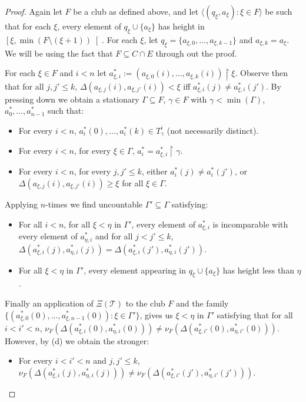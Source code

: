 \documentclass[a4paper,noamsfonts]{amsart}
\theoremstyle{definition}
\newcommand{\seb}{\subseteq}
\newcommand{\setm}{\setminus}
\newcommand{\res}{\!\upharpoonright\!}
\newcommand{\tup}[1]{\langle#1\rangle}
\newcommand{\1}{\mathbbm{1}}
\newcommand{\T}{\mathcal{T}}
\newcommand{\prop}{\Xi}
\begin{document}
\begin{proof}
  Again let $F$ be a club as defined above, and let
  $\tup{(q_{\xi},a_{\xi}) : \xi \in F}$ be such that
  for each $\xi$, every element of $q_{\xi} \cup \{a_{\xi}\}$ has height
  in $\left[\xi,\min(F\setm(\xi+1))\right[$. For each $\xi$,
  let $q_{\xi} = \{a_{\xi,0},\dots,a_{\xi,k-1}\}$ and
  $a_{\xi,k} = a_{\xi}$. We will be using the fact that
  $F \seb C \cap E$ through out the proof.

  For each $\xi \in F$ and $i < n$ let
  $a_{\xi,i}^{*} := (a_{\xi,0}(i),\dots,a_{\xi,k}(i))\res \xi$.
  Observe then that for all $j,j' \le k$,
  $\Delta(a_{\xi,j}(i),a_{\xi,j'}(i)) < \xi$ iff
  $a_{\xi,i}^{*}(j) \neq a_{\xi,i}^{*}(j')$. By pressing down
  we obtain a stationary $\Gamma \seb F$,
  $\gamma \in F$ with $\gamma < \min(\Gamma)$,
  $a^{*}_{0},\dots,a^{*}_{n-1}$ such that:
  \begin{itemize}
    \item[(a)] For every $i < n$, $a^{*}_{i}(0),\dots,a^{*}_{i}(k) \in
    T^{i}_{\gamma}$ (not necessarily distinct).
    \item[(b)] For every $i < n$, for every $\xi \in \Gamma$,
    $a^{*}_{i}  = a_{\xi,i}^{*}\res \gamma$.
    \item[(c)] For every $i < n$, for every $j,j' \le k$,
    either $a^{*}_{i}(j) \neq a^{*}_{i}(j')$, or
    $\Delta(a_{\xi,j}(i),a_{\xi,j'}(i)) \ge \xi$ for all
    $\xi \in \Gamma$.
  \end{itemize}
  Applying
   $n$-times we find uncountable
  $\Gamma' \seb \Gamma$ satisfying:
  \begin{itemize}
    \item[(d)] For all $i < n$, for all $\xi < \eta$ in $\Gamma'$,
    every element of $a^{*}_{\xi,i}$ is incomparable with every element
    of $a^{*}_{\eta,i}$ and for all $j < j' \le k$,
    $\Delta(a^{*}_{\xi,i}(j),a^{*}_{\eta,i}(j)) =
    \Delta(a^{*}_{\xi,i}(j'),a^{*}_{\eta,i}(j'))$.
    \item[(e)] For all $\xi < \eta$ in $\Gamma'$,
    every element appearing in $q_{\xi} \cup \{a_{\xi}\}$ has
    height less than $\eta$.
  \end{itemize}
  Finally an application of $\prop(\T)$ to the club $F$ and the family
  $\{(a^{*}_{\xi,0}(0),\dots,a^{*}_{\xi,n-1}(0)) : \xi \in \Gamma'\}$, gives us
  $\xi < \eta$ in $\Gamma'$ satisfying that for all $i < i' < n$,
  $\nu_{F}(\Delta(a^{*}_{\xi,i}(0),a^{*}_{\eta,i}(0))) \neq
  \nu_{F}(\Delta(a^{*}_{\xi,i'}(0),a^{*}_{\eta,i'}(0)))$. However, by
  (d) we obtain the stronger:
  \begin{itemize}
    \item[(f)] For every $i < i' < n$ and $j,j' \le k$,
    $\nu_{F}(\Delta(a^{*}_{\xi,i}(j),a^{*}_{\eta,i}(j))) \neq
    \nu_{F}(\Delta(a^{*}_{\xi,i'}(j'),a^{*}_{\eta,i'}(j')))$.
  \end{itemize}


\end{proof}
\end{document}
